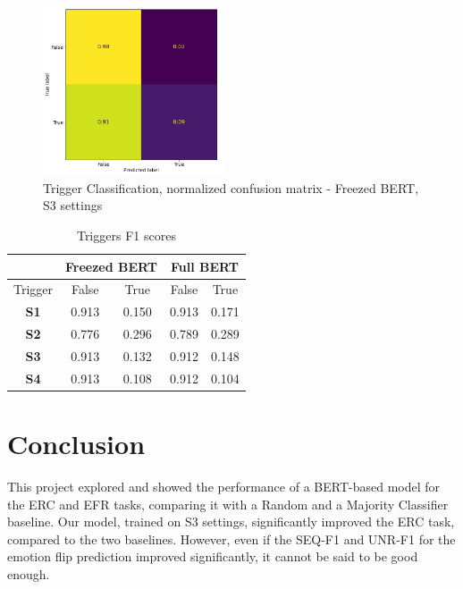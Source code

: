 \documentclass[11pt,table,xcdraw]{article}
\begin{document}
\begin{figure}[]
    \centering
    \includegraphics[width=0.48\textwidth]{img/cm_tri_S3.png}
    \caption{Trigger Classification, normalized confusion matrix - Freezed BERT, S3 settings}
    \label{fig:cm_tri}
    \centering
\end{figure}



\begin{table}[h]
    \centering
    \caption{Triggers F1 scores}
    \label{tab:triggers_f1}
    \begin{tabular}{|c|cc|cc|}
    \hline
                & \multicolumn{2}{c|}{Freezed BERT}  & \multicolumn{2}{c|}{Full BERT}     \\ \hline
    Trigger     & \multicolumn{1}{c|}{False}     & True    & \multicolumn{1}{c|}{False}     & True     \\ \hline
    \textbf{S1} & \multicolumn{1}{c|}{0.913} & 0.150 & \multicolumn{1}{c|}{0.913} & 0.171 \\ \hline
    \textbf{S2} & \multicolumn{1}{c|}{0.776} & 0.296 & \multicolumn{1}{c|}{0.789} & 0.289 \\ \hline
    \textbf{S3} & \multicolumn{1}{c|}{0.913} & 0.132 & \multicolumn{1}{c|}{0.912} & 0.148 \\ \hline
    \textbf{S4} & \multicolumn{1}{c|}{0.913} & 0.108 & \multicolumn{1}{c|}{0.912} & 0.104 \\ \hline
    \end{tabular}
\end{table}

\section{Conclusion}
\label{sec:conclusion}

This project explored and showed the performance of a BERT-based model for the ERC and EFR tasks, comparing it with a Random and a Majority Classifier baseline. Our model, trained on S3 settings, significantly improved the ERC task, compared to the two baselines. However, even if the SEQ-F1 and UNR-F1 for the emotion flip prediction improved significantly, it cannot be said to be good enough. 
\end{document}

